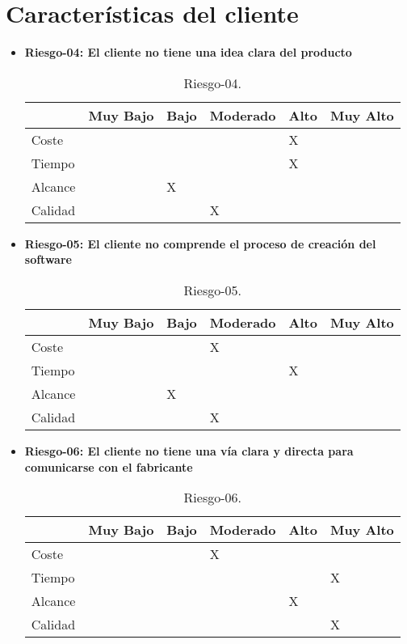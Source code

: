 \section{Características del cliente}
\begin{itemize}
	\item \textbf{Riesgo-04: El cliente no tiene una idea clara del producto}
	\begin{table}[H]
	\begin{center}
	\begin{tabular}{ l l l l l l }
	\hline
	& Muy Bajo & Bajo & Moderado & Alto & Muy Alto \\ \hline \hline
	Coste &  &  &  & X &  \\ \hline
	Tiempo &  &  &  & X &  \\ \hline
	Alcance &  & X &  &  &  \\ \hline
	Calidad &  &  & X &  &  \\ \hline
	\end{tabular}
	\caption{Riesgo-04.}
	\label{Riesgo-04}
	\end{center}
	\end{table}
	\item \textbf{Riesgo-05: El cliente no comprende el proceso de creación del software}
	\begin{table}[H]
	\begin{center}
	\begin{tabular}{ l l l l l l }
	\hline
	& Muy Bajo & Bajo & Moderado & Alto & Muy Alto \\ \hline \hline
	Coste &  &  & X &  &  \\ \hline
	Tiempo &  &  &  & X &  \\ \hline
	Alcance &  & X &  &  &  \\ \hline
	Calidad &  &  & X &  &  \\ \hline
	\end{tabular}
	\caption{Riesgo-05.}
	\label{Riesgo-05}
	\end{center}
	\end{table}
	\item \textbf{Riesgo-06: El cliente no tiene una vía clara y directa para comunicarse con el fabricante}
	\begin{table}[H]
	\begin{center}
	\begin{tabular}{ l l l l l l }
	\hline
	& Muy Bajo & Bajo & Moderado & Alto & Muy Alto \\ \hline \hline
	Coste &  &  & X &  &  \\ \hline
	Tiempo &  &  &  & & X  \\ \hline
	Alcance &  & & & X  &  \\ \hline
	Calidad &  &  & & & X  \\ \hline
	\end{tabular}
	\caption{Riesgo-06.}
	\label{Riesgo-06}
	\end{center}
	\end{table}
\end{itemize}

